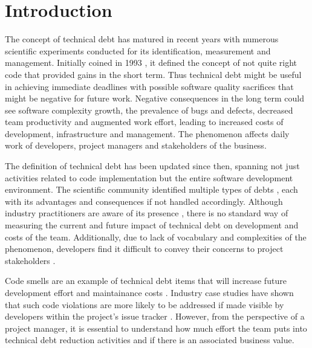 \section{Introduction}
\label{introduction}

The concept of technical debt has matured in recent years with numerous
scientific experiments conducted for its identification, measurement and
management. Initially coined in 1993 \cite{Cunningham1993}, it defined the
concept of not quite right code that provided gains in the short term. Thus
technical debt might be useful in achieving immediate deadlines with possible
software quality sacrifices that might be negative for future work. Negative
consequences in the long term could see software complexity growth, the
prevalence of bugs and defects, decreased team productivity and augmented work
effort, leading to increased costs of development, infrastructure and
management. The phenomenon affects daily work of developers, project managers
and stakeholders of the business.

The definition of technical debt has been updated since then, spanning not just
activities related to code implementation but the entire software development
environment. The scientific community identified multiple types of debts
\cite{Li2015}, each with its advantages and consequences if not handled
accordingly. Although industry practitioners are aware of its presence
\cite{Codabux2013} \cite{Lim2012}, there is no standard way of measuring the
current and future impact of technical debt on development and costs of the
team. Additionally, due to lack of vocabulary and complexities of the
phenomenon, developers find it difficult to convey their concerns to project
stakeholders \cite{Kruchten2012}.

Code smells are an example of technical debt items that will increase future
development effort and maintainance costs \cite{Fowler1999}. Industry case
studies have shown that such code violations are more likely to be addressed if
made visible by developers within the project's issue tracker \cite{Lim2012}.
However, from the perspective of a project manager, it is essential to
understand how much effort the team puts into technical debt reduction
activities and if there is an associated business value.

